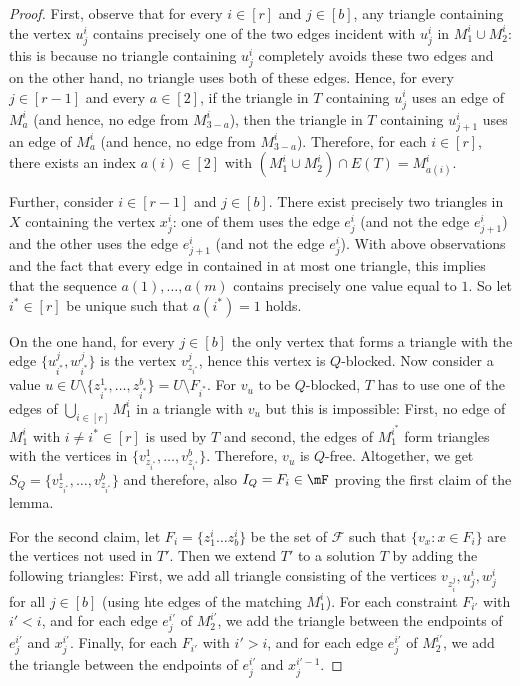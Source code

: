 \documentclass[a4paper,UKenglish,cleveref, autoref, thm-restate]{lipics-v2021}
\begin{document}
\begin{proof}
    First, observe that for every $i\in [r]$ and $j \in [b]$, any triangle containing the vertex $u^i_j$ contains precisely one of the two edges incident with $u^i_j$ in $M_1^i \cup M_2^i$: this is because no triangle containing $u^i_j$ completely avoids these two edges and on the other hand, no triangle uses both of these edges.
    Hence, for every $j \in [r-1]$ and every $a \in [2]$, if the triangle in $T$ containing $u^i_j$ uses an edge of $M_a^i$ (and hence, no edge from $M_{3-a}^i$), then the triangle in $T$ containing $u^i_{j+1}$ uses an edge of $M_a^i$ (and hence, no edge from $M_{3-a}^i$). 
    Therefore, for each $i\in [r]$, there exists an index $a(i) \in [2]$ with $(M_1^i \cup M_2^i) \cap E(T) = M_{a(i)}^i$. 
    
    Further, consider $i \in [r-1]$ and $j \in [b]$.
    There exist precisely two triangles in $X$ containing the vertex $x^i_j$: one of them uses the edge $e^i_j$ (and not the edge $e^i_{j+1}$) and the other uses the edge $e^i_{j+1}$ (and not the edge $e^i_j$).
    With above observations and the fact that every edge in contained in at most one triangle, this implies that the sequence $a(1), \dots, a(m)$ contains precisely one value equal to $1$.     
    So let $i^* \in [r]$ be unique such that $a(i^*) = 1$ holds.
    
    On the one hand, for every $j \in [b]$ the only vertex that forms a triangle with the edge $\{u_{i^*}^j, w_{i^*}^j\}$ is the vertex $v_{z_{i^*}}^j$, hence this vertex is $Q$-blocked.
    Now consider a value $u \in U \setminus \{z_{i^*}^1, \dots, z_{i^*}^b\} = U \setminus F_{i^*}$.
    For $v_u$ to be $Q$-blocked, $T$ has to use one of the edges of $\bigcup_{i \in [r]} M_1^i$ in a triangle with $v_u$ but this is impossible:
    First, no edge of $M_1^i$ with $i \neq i^* \in [r]$ is used by $T$ and second, the edges of $M_1^{i^*}$ form triangles with the vertices in $\{v_{z_{i^*}}^1, \dots, v_{z_{i^*}}^b\}$.
    Therefore, $v_u$ is $Q$-free.
    Altogether, we get $S_Q = \{v_{z_{i^*}}^1, \dots, v_{z_{i^*}}^b\}$ and therefore, also $I_Q = F_i \in \mF$ proving the first claim of the lemma.
    
    For the second claim, let $F_i = \{z^i_1\dots z^i_b\}$ be the set of $\mathcal{F}$ such that $\{v_x\colon x\in F_i\}$ are the vertices not used in $T'$. Then we extend $T'$ to a solution $T$ by adding the following triangles: First, we add all triangle consisting of the vertices $v_{z_i^j}, u^i_j, w^i_j$ for all $j\in [b]$ (using hte edges of the matching $M_1^i$). For each constraint $F_{i'}$ with $i' < i$, and for each edge $e^{i'}_j$ of $M_2^{i'}$, we add the triangle between the endpoints of $e^{i'}_j$ and $x^{i'}_j$. Finally, for each $F_{i'}$ with $i'>i$, and for each edge $e^{i'}_j$ of $M_2^{i'}$, we add the triangle between the endpoints of $e^{i'}_j$ and $x^{i'-1}_j$.
\end{proof}
\end{document}
